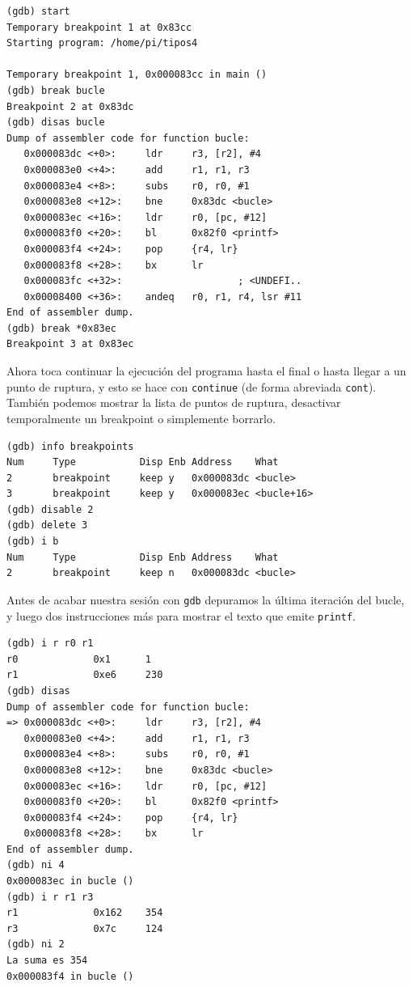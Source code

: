 \begin{lstlisting}
(gdb) start
Temporary breakpoint 1 at 0x83cc
Starting program: /home/pi/tipos4

Temporary breakpoint 1, 0x000083cc in main ()
(gdb) break bucle
Breakpoint 2 at 0x83dc
(gdb) disas bucle
Dump of assembler code for function bucle:
   0x000083dc <+0>:     ldr     r3, [r2], #4
   0x000083e0 <+4>:     add     r1, r1, r3
   0x000083e4 <+8>:     subs    r0, r0, #1
   0x000083e8 <+12>:    bne     0x83dc <bucle>
   0x000083ec <+16>:    ldr     r0, [pc, #12]
   0x000083f0 <+20>:    bl      0x82f0 <printf>
   0x000083f4 <+24>:    pop     {r4, lr}
   0x000083f8 <+28>:    bx      lr
   0x000083fc <+32>:                    ; <UNDEFI..
   0x00008400 <+36>:    andeq   r0, r1, r4, lsr #11
End of assembler dump.
(gdb) break *0x83ec
Breakpoint 3 at 0x83ec
\end{lstlisting}

Ahora toca continuar la ejecución del programa hasta el final o hasta llegar a
un punto de ruptura, y esto se hace con {\tt continue} (de forma abreviada {\tt cont}).
También podemos mostrar la lista de puntos de ruptura, desactivar temporalmente un breakpoint
o simplemente borrarlo.

\begin{lstlisting}
(gdb) info breakpoints
Num     Type           Disp Enb Address    What
2       breakpoint     keep y   0x000083dc <bucle>
3       breakpoint     keep y   0x000083ec <bucle+16>
(gdb) disable 2
(gdb) delete 3
(gdb) i b
Num     Type           Disp Enb Address    What
2       breakpoint     keep n   0x000083dc <bucle>
\end{lstlisting}

Antes de acabar nuestra sesión con {\tt gdb} depuramos la última iteración del bucle,
y luego dos instrucciones más para mostrar el texto que emite {\tt printf}.

\begin{lstlisting}
(gdb) i r r0 r1
r0             0x1      1
r1             0xe6     230
(gdb) disas
Dump of assembler code for function bucle:
=> 0x000083dc <+0>:     ldr     r3, [r2], #4
   0x000083e0 <+4>:     add     r1, r1, r3
   0x000083e4 <+8>:     subs    r0, r0, #1
   0x000083e8 <+12>:    bne     0x83dc <bucle>
   0x000083ec <+16>:    ldr     r0, [pc, #12]
   0x000083f0 <+20>:    bl      0x82f0 <printf>
   0x000083f4 <+24>:    pop     {r4, lr}
   0x000083f8 <+28>:    bx      lr
End of assembler dump.
(gdb) ni 4
0x000083ec in bucle ()
(gdb) i r r1 r3
r1             0x162    354
r3             0x7c     124
(gdb) ni 2
La suma es 354
0x000083f4 in bucle ()
\end{lstlisting}

